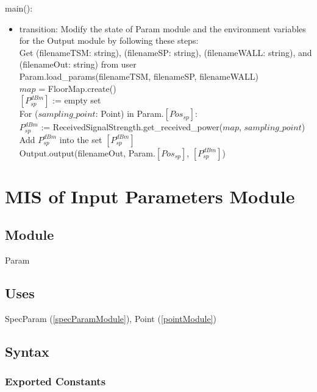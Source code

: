 \documentclass[12pt, titlepage]{article}
\begin{document}
\noindent main():
\begin{itemize}
\item transition: Modify the state of Param module and the environment variables for the
Output module by following these steps:\\

	Get (filenameTSM: string), (filenameSP: string), (filenameWALL: string), and (filenameOut: string) from user\\
	
	Param.load\_params(filenameTSM, filenameSP, filenameWALL)\\
	
	$map$ = FloorMap.create()\\
	
	$[P_{sp}^{dBm}]$ := empty set\\
	For ($sampling\_point$: Point) in Param.$[Pos_{sp}]$:\\
	$P_{sp}^{dBm}$ := ReceivedSignalStrength.get\_received\_power($map$, $sampling\_point$)\\
	Add $P_{sp}^{dBm}$ into the set $[P_{sp}^{dBm}]$\\
	
	Output.output(filenameOut, Param.$[Pos_{sp}]$, $[P_{sp}^{dBm}]$)
\end{itemize}

\newpage


\section{MIS of Input Parameters Module} \label{inputParamModule}

\subsection{Module}

Param

\subsection{Uses}

SpecParam (\autoref{specParamModule}), Point (\autoref{pointModule})

\subsection{Syntax}

\subsubsection{Exported Constants}
\end{document}
